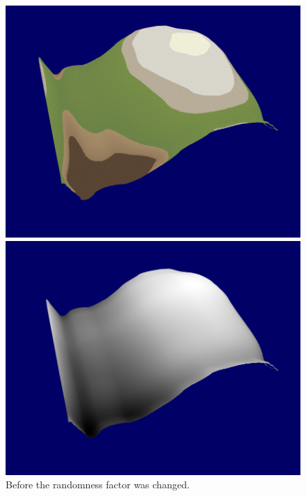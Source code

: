 \documentclass[a4paper,10pt]{report}
\begin{document}
\begin{figure}[h!]
\centering
\begin{minipage}{.4\textwidth}
  \centering
  \includegraphics[width=.9\linewidth]{Images/Sprint-Images/Sprint-7-Before-Colour.png}
    \end{minipage}%
\begin{minipage}{.4\textwidth}
  \centering
  \includegraphics[width=.9\linewidth]{Images/Sprint-Images/Sprint-7-Before-Greyscale.png}
\end{minipage}
\caption{Before the randomness factor was changed.}
\label{before-random}
\end{figure}
\end{document}
